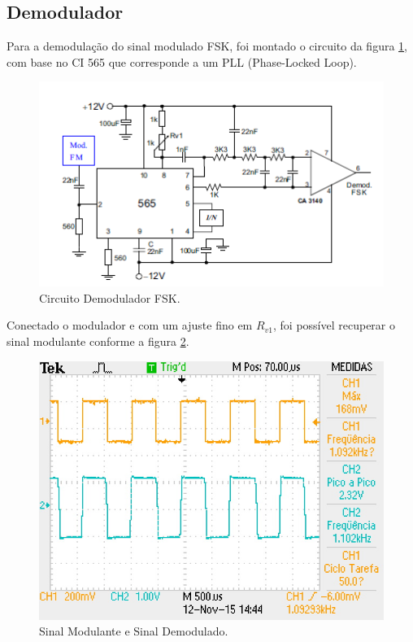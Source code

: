 \documentclass[12pt,a4paper]{article}%
\begin{document}
\subsection{Demodulador}

Para a demodulação do sinal modulado FSK, foi montado o circuito da figura \ref{fig:circuito}, com base no CI 565 que corresponde a um PLL (Phase-Locked Loop).

\begin{figure}[H]
\centering
\includegraphics{imagem/circuito.png}
\caption{Circuito Demodulador FSK.}
\label{fig:circuito}
\end{figure}

Conectado o modulador e com um ajuste fino em $R_{v1}$, foi possível recuperar o sinal modulante conforme a figura \ref{fig:09}.

\begin{figure}[H]
\centering
\includegraphics[scale=0.5]{imagem/TEK0009}
\caption{Sinal Modulante e Sinal Demodulado.}
\label{fig:09}
\end{figure}
\end{document}
